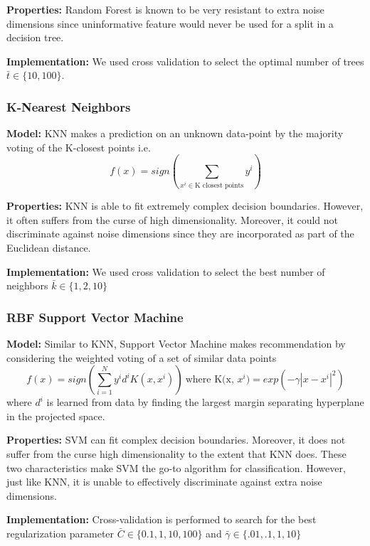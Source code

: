 \documentclass{article}
\begin{document}
\textbf{Properties:}
Random Forest is known to be very resistant to extra noise dimensions since
uninformative feature would never be used for a split in a decision tree.

\textbf{Implementation:}
We used cross validation to select the optimal number of trees $\bar{t} \in
\{10, 100\}$.

\subsubsection*{K-Nearest Neighbors}
\textbf{Model:}
KNN makes a prediction on an unknown data-point by the majority voting of the
K-closest points i.e. $$f(x) = sign(\sum_{x^i \in \text{K closest points}} y^i)
$$

\textbf{Properties:}
KNN is able to fit extremely complex decision boundaries. However, it often
suffers from the curse of high dimensionality. Moreover, it
could not discriminate against noise dimensions since they are incorporated as
part of the Euclidean distance.

\textbf{Implementation:}
We used cross validation to select the best number of neighbors $\bar{k} \in
\{1, 2, 10\}$




\subsubsection*{RBF Support Vector Machine}
\textbf{Model:}
Similar to KNN, Support Vector Machine makes recommendation by considering the
weighted voting of a set of similar data points
$$
f(x)
= sign(\sum_{i=1}^{N} y^i d^i K(x, x^i))\ \text{where K(x, $x^i$)}
= exp(-\gamma|x - x^i|^2)
$$
where $d^i$ is learned from data by finding the largest margin separating
hyperplane in the projected space.

\textbf{Properties:}
SVM can fit complex decision boundaries. Moreover, it does not suffer from the
curse high dimensionality to the extent that KNN does. These two
characteristics make SVM the go-to algorithm for classification. However, just
like KNN, it is unable to effectively discriminate against extra noise
dimensions.

\textbf{Implementation:}
Cross-validation is performed to search for the best regularization parameter
$\bar{C} \in \{0.1, 1, 10, 100\}$ and $\bar{\gamma} \in \{.01, .1, 1, 10\}$
\end{document}
